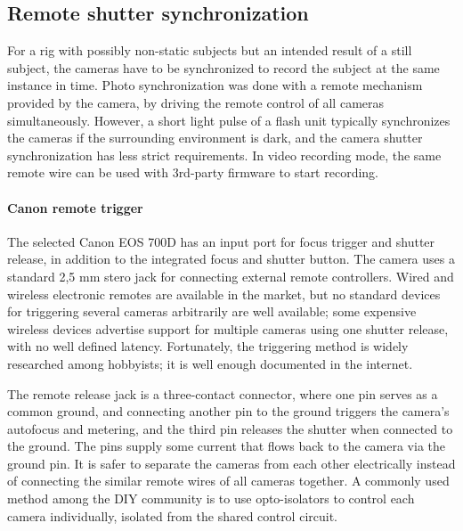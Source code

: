 
\subsection{Remote shutter synchronization} %

For a rig with possibly non-static subjects but an intended result of a still subject, the cameras have to be synchronized to record the subject at the same instance in time.
Photo synchronization was done with a remote mechanism provided by the camera, by driving the remote control of all cameras simultaneously.
However, a short light pulse of a flash unit typically synchronizes the cameras if the surrounding environment is dark, and the camera shutter synchronization has less strict requirements.
In video recording mode, the same remote wire can be used with 3rd-party firmware to start recording.


\paragraph{Canon remote trigger}

The selected Canon EOS 700D has an input port for focus trigger and shutter release, in addition to the integrated focus and shutter button.
The camera uses a standard 2,5 mm stero jack for connecting external remote controllers.
Wired and wireless electronic remotes are available in the market, but no standard devices for triggering several cameras arbitrarily are well available; some expensive wireless devices advertise support for multiple cameras using one shutter release, with no well defined latency.
Fortunately, the triggering method is widely researched among hobbyists; it is well enough documented in the internet.

The remote release jack is a three-contact connector, where one pin serves as a common ground, and connecting another pin to the ground triggers the camera's autofocus and metering, and the third pin releases the shutter when connected to the ground. \cite{docdiy}
The pins supply some current that flows back to the camera via the ground pin.
It is safer to separate the cameras from each other electrically instead of connecting the similar remote wires of all cameras together.
A commonly used method among the DIY community is to use opto-isolators to control each camera individually, isolated from the shared control circuit.

